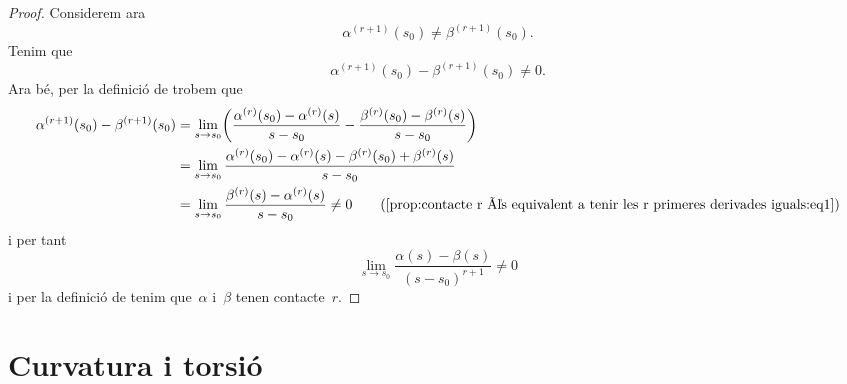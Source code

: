 \documentclass[../../main.tex]{subfiles}
\begin{document}
\begin{proposition}
\begin{proof}
            Considerem ara
            \[
                \alpha^{(r+1)}(s_{0})\neq\beta^{(r+1)}(s_{0}).
            \]
            Tenim que
            \[
                \alpha^{(r+1)}(s_{0})-\beta^{(r+1)}(s_{0})\neq0.
            \]
            Ara bé, per la definició de  trobem que
            \begin{align*}
                \alpha^{(r+1)}(s_{0})-\beta^{(r+1)}(s_{0})&=\lim_{s\to s_{0}}\left(\frac{\alpha^{(r)}(s_{0})-\alpha^{(r)}(s)}{s-s_{0}}-\frac{\beta^{(r)}(s_{0})-\beta^{(r)}(s)}{s-s_{0}}\right) \\
                 &=\lim_{s\to s_{0}}\frac{\alpha^{(r)}(s_{0})-\alpha^{(r)}(s)-\beta^{(r)}(s_{0})+\beta^{(r)}(s)}{s-s_{0}} \\
                 &=\lim_{s\to s_{0}}\frac{\beta^{(r)}(s)-\alpha^{(r)}(s)}{s-s_{0}}\neq0 \tag{\ref{prop:contacte r és equivalent a tenir les r primeres derivades iguals:eq1}}
            \end{align*}
            i per tant
            \[
                \lim_{s\to s_{0}}\frac{\alpha(s)-\beta(s)}{(s-s_{0})^{r+1}}\neq0
            \]
            i per la definició de  tenim que~\(\alpha\) i~\(\beta\) tenen contacte~\(r\).
        \end{proof}
    \end{proposition}
\section{Curvatura i torsió}
\end{document}
